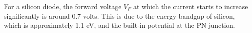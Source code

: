 For a silicon diode, the forward voltage \( V_F \) at which the current starts to increase significantly is around 0.7 volts. This is due to the energy bandgap of silicon, which is approximately 1.1 eV, and the built-in potential at the PN junction.

